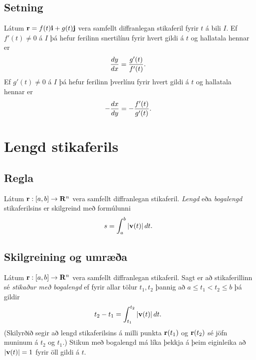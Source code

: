 \documentclass[a4paper,10pt,icelandic]{sphinxmanual}
\begin{document}
\subsection{Setning}
\label{Kafli1:id7}\label{Kafli1:index-5}
Látum \(\mbox{${\bf r}$}=f(t)\mbox{${\bf i}$}+g(t)\mbox{${\bf j}$}\)
vera samfellt diffranlegan stikaferil fyrir \(t\) á bili \(I\).
Ef \(f'(t) \neq 0\) á \(I\) þá hefur ferilinn snertilínu fyrir
hvert gildi á \(t\) og hallatala hennar er
\begin{gather}
\begin{split}\displaystyle \frac{dy}{dx} = \frac{g'(t)}{f'(t)}.\end{split}\notag
\end{gather}
Ef \(g'(t) \neq 0\) á \(I\) þá hefur ferilinn þverlínu fyrir
hvert gildi á \(t\) og hallatala hennar er
\begin{gather}
\begin{split}\displaystyle -\frac{dx}{dy} = -\frac{f'(t)}{g'(t)}.\end{split}\notag
\end{gather}

\section{Lengd stikaferils}
\label{Kafli1:lengd-stikaferils}\label{Kafli1:index-6}

\subsection{Regla}
\label{Kafli1:regla}
Látum \(\mbox{${\bf r}$}:  [a,b]\rightarrow \mbox{${\bf R}^n$}\)
vera samfellt diffranlegan stikaferil. \emph{Lengd} eða \emph{bogalengd}
stikaferilsins er skilgreind með formúlunni
\begin{gather}
\begin{split}\displaystyle s=\int_a^b |\mbox{${\bf v}$}(t)|\,dt.\end{split}\notag
\end{gather}

\subsection{Skilgreining og umræða}
\label{Kafli1:index-7}\label{Kafli1:skilgreining-og-umraea}
Látum \(\mbox{${\bf r}$}: [a,b]\rightarrow \mbox{${\bf R}^n$}\) vera
samfellt diffranlegan stikaferil. Sagt er að stikaferillinn sé \emph{stikaður
með bogalengd} ef fyrir allar tölur \(t_1,
t_2\) þannig að \(a\leq t_1<t_2\leq b\) þá gildir
\begin{gather}
\begin{split}\displaystyle t_2-t_1= \int_{t_1}^{t_2} |\mbox{${\bf v}$}(t)|\,dt.\end{split}\notag
\end{gather}
(Skilyrðið segir að lengd stikaferilsins á milli punkta
\(\mbox{${\bf r}$}(t_1)\) og \(\mbox{${\bf r}$}(t_2)\) sé jöfn
muninum á \(t_2\) og \(t_1\).) Stikun með bogalengd má líka
þekkja á þeim eiginleika að \(|\mbox{${\bf v}$}(t)|=1\) fyrir öll
gildi á \(t\).
\end{document}
